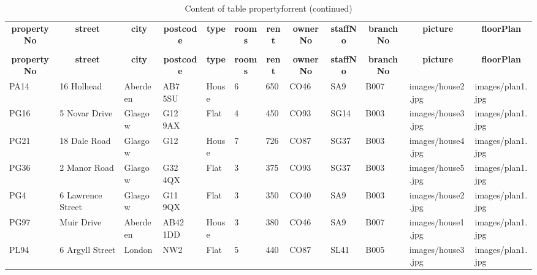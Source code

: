 %
%
 \begin{longtable}{|l|l|l|l|l|l|l|l|l|l|l|l|} 
 \hline \endhead \hline \endfoot \hline 
 \caption{Content of table propertyforrent} \label{tab:propertyforrent-data} \\\hline \multicolumn{1}{|c|}{\textbf{propertyNo}} & \multicolumn{1}{|c|}{\textbf{street}} & \multicolumn{1}{|c|}{\textbf{city}} & \multicolumn{1}{|c|}{\textbf{postcode}} & \multicolumn{1}{|c|}{\textbf{type}} & \multicolumn{1}{|c|}{\textbf{rooms}} & \multicolumn{1}{|c|}{\textbf{rent}} & \multicolumn{1}{|c|}{\textbf{ownerNo}} & \multicolumn{1}{|c|}{\textbf{staffNo}} & \multicolumn{1}{|c|}{\textbf{branchNo}} & \multicolumn{1}{|c|}{\textbf{picture}} & \multicolumn{1}{|c|}{\textbf{floorPlan}} \\ \hline \hline  \endfirsthead 
\caption{Content of table propertyforrent (continued)} \\ \hline \multicolumn{1}{|c|}{\textbf{propertyNo}} & \multicolumn{1}{|c|}{\textbf{street}} & \multicolumn{1}{|c|}{\textbf{city}} & \multicolumn{1}{|c|}{\textbf{postcode}} & \multicolumn{1}{|c|}{\textbf{type}} & \multicolumn{1}{|c|}{\textbf{rooms}} & \multicolumn{1}{|c|}{\textbf{rent}} & \multicolumn{1}{|c|}{\textbf{ownerNo}} & \multicolumn{1}{|c|}{\textbf{staffNo}} & \multicolumn{1}{|c|}{\textbf{branchNo}} & \multicolumn{1}{|c|}{\textbf{picture}} & \multicolumn{1}{|c|}{\textbf{floorPlan}} \\ \hline \hline \endhead \endfoot
PA14 & 16 Holhead & Aberdeen & AB7 5SU & House & 6 & 650 & CO46 & SA9 & B007 & images/house2.jpg & images/plan1.jpg \\ \hline 
PG16 & 5 Novar Drive & Glasgow & G12 9AX & Flat & 4 & 450 & CO93 & SG14 & B003 & images/house3.jpg & images/plan1.jpg \\ \hline 
PG21 & 18 Dale Road & Glasgow & G12 & House & 7 & 726 & CO87 & SG37 & B003 & images/house4.jpg & images/plan1.jpg \\ \hline 
PG36 & 2 Manor Road & Glasgow & G32 4QX & Flat & 3 & 375 & CO93 & SG37 & B003 & images/house5.jpg & images/plan1.jpg \\ \hline 
PG4 & 6 Lawrence Street & Glasgow & G11 9QX & Flat & 3 & 350 & CO40 & SA9 & B003 & images/house2.jpg & images/plan1.jpg \\ \hline 
PG97 & Muir Drive & Aberdeen & AB42 1DD & House & 3 & 380 & CO46 & SA9 & B007 & images/house1.jpg & images/plan1.jpg \\ \hline 
PL94 & 6 Argyll Street & London & NW2 & Flat & 5 & 440 & CO87 & SL41 & B005 & images/house3.jpg & images/plan1.jpg \\ \hline 
 \end{longtable}
